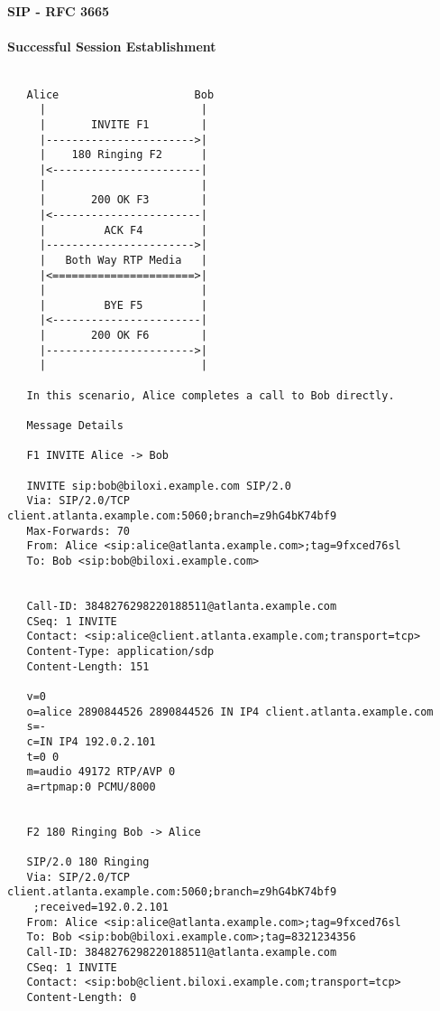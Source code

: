 \documentclass[a4paper,12pt]{report}
\newenvironment{myscriptlisting}
{\begin{list}{}{\setlength{\leftmargin}{1em}}\item\scriptsize\bfseries}
{\end{list}}
\begin{document}
\paragraph{SIP - RFC 3665 \cite{johnrfc3665}}

\paragraph{Successful Session Establishment}
\begin{myscriptlisting}
\begin{verbatim}

   Alice                     Bob
     |                        |
     |       INVITE F1        |
     |----------------------->|
     |    180 Ringing F2      |
     |<-----------------------|
     |                        |
     |       200 OK F3        |
     |<-----------------------|
     |         ACK F4         |
     |----------------------->|
     |   Both Way RTP Media   |
     |<======================>|
     |                        |
     |         BYE F5         |
     |<-----------------------|
     |       200 OK F6        |
     |----------------------->|
     |                        |

   In this scenario, Alice completes a call to Bob directly.

   Message Details

   F1 INVITE Alice -> Bob

   INVITE sip:bob@biloxi.example.com SIP/2.0
   Via: SIP/2.0/TCP client.atlanta.example.com:5060;branch=z9hG4bK74bf9
   Max-Forwards: 70
   From: Alice <sip:alice@atlanta.example.com>;tag=9fxced76sl
   To: Bob <sip:bob@biloxi.example.com>


   Call-ID: 3848276298220188511@atlanta.example.com
   CSeq: 1 INVITE
   Contact: <sip:alice@client.atlanta.example.com;transport=tcp>
   Content-Type: application/sdp
   Content-Length: 151

   v=0
   o=alice 2890844526 2890844526 IN IP4 client.atlanta.example.com
   s=-
   c=IN IP4 192.0.2.101
   t=0 0
   m=audio 49172 RTP/AVP 0
   a=rtpmap:0 PCMU/8000


   F2 180 Ringing Bob -> Alice

   SIP/2.0 180 Ringing
   Via: SIP/2.0/TCP client.atlanta.example.com:5060;branch=z9hG4bK74bf9
    ;received=192.0.2.101
   From: Alice <sip:alice@atlanta.example.com>;tag=9fxced76sl
   To: Bob <sip:bob@biloxi.example.com>;tag=8321234356
   Call-ID: 3848276298220188511@atlanta.example.com
   CSeq: 1 INVITE
   Contact: <sip:bob@client.biloxi.example.com;transport=tcp>
   Content-Length: 0



\end{verbatim}
\end{myscriptlisting}
\end{document}
